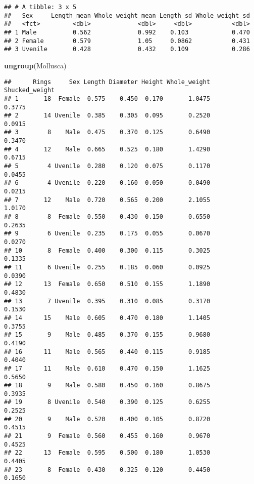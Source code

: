 \documentclass[
]{article}
\newenvironment{Shaded}{\begin{snugshade}}{\end{snugshade}}
\newcommand{\KeywordTok}[1]{\textcolor[rgb]{0.13,0.29,0.53}{\textbf{#1}}}
\newcommand{\NormalTok}[1]{#1}
\begin{document}
\begin{verbatim}
## # A tibble: 3 x 5
##   Sex     Length_mean Whole_weight_mean Length_sd Whole_weight_sd
##   <fct>         <dbl>             <dbl>     <dbl>           <dbl>
## 1 Male          0.562             0.992    0.103            0.470
## 2 Female        0.579             1.05     0.0862           0.431
## 3 Uvenile       0.428             0.432    0.109            0.286
\end{verbatim}

\begin{Shaded}
\begin{Highlighting}[]
\KeywordTok{ungroup}\NormalTok{(Mollusca)}
\end{Highlighting}
\end{Shaded}

\begin{verbatim}
##      Rings     Sex Length Diameter Height Whole_weight Shucked_weight
## 1       18  Female  0.575    0.450  0.170       1.0475         0.3775
## 2       14 Uvenile  0.385    0.305  0.095       0.2520         0.0915
## 3        8    Male  0.475    0.370  0.125       0.6490         0.3470
## 4       12    Male  0.665    0.525  0.180       1.4290         0.6715
## 5        4 Uvenile  0.280    0.120  0.075       0.1170         0.0455
## 6        4 Uvenile  0.220    0.160  0.050       0.0490         0.0215
## 7       12    Male  0.720    0.565  0.200       2.1055         1.0170
## 8        8  Female  0.550    0.430  0.150       0.6550         0.2635
## 9        6 Uvenile  0.235    0.175  0.055       0.0670         0.0270
## 10       8  Female  0.400    0.300  0.115       0.3025         0.1335
## 11       6 Uvenile  0.255    0.185  0.060       0.0925         0.0390
## 12      13  Female  0.650    0.510  0.155       1.1890         0.4830
## 13       7 Uvenile  0.395    0.310  0.085       0.3170         0.1530
## 14      15    Male  0.605    0.470  0.180       1.1405         0.3755
## 15       9    Male  0.485    0.370  0.155       0.9680         0.4190
## 16      11    Male  0.565    0.440  0.115       0.9185         0.4040
## 17      11    Male  0.610    0.470  0.150       1.1625         0.5650
## 18       9    Male  0.580    0.450  0.160       0.8675         0.3935
## 19       8 Uvenile  0.540    0.390  0.125       0.6255         0.2525
## 20       9    Male  0.520    0.400  0.105       0.8720         0.4515
## 21       9  Female  0.560    0.455  0.160       0.9670         0.4525
## 22      13  Female  0.595    0.500  0.180       1.0530         0.4405
## 23       8  Female  0.430    0.325  0.120       0.4450         0.1650

\end{verbatim}
\end{document}
